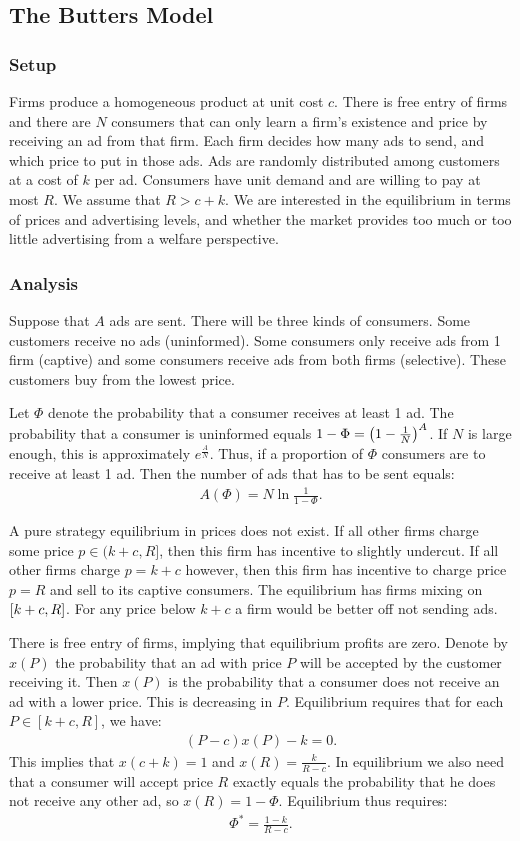 \subsection{The Butters Model}
\subsubsection{Setup}
Firms produce a homogeneous product at unit cost $c$. There is free entry of firms and there are $N$ consumers that can only learn a
firm's existence and price by receiving an ad from that firm. Each firm decides how many ads to send, and which price to put in those ads.
Ads are randomly distributed among customers at a cost of $k$ per ad. Consumers have unit demand and are willing to pay at most $R$.
We assume that $R>c+k$. We are interested in the equilibrium in terms of prices and advertising levels, and whether the market provides
too much or too little advertising from a welfare perspective.
\subsubsection{Analysis}
Suppose that $A$ ads are sent. There will be three kinds of consumers. Some customers receive no ads (uninformed). Some consumers only
receive ads from 1 firm (captive) and some consumers receive ads from both firms (selective). These customers buy from the lowest price.

Let $\Phi$ denote the probability that a consumer receives at least 1 ad. The probability that a consumer is uninformed equals
$1-\Phi=\left(1-\frac{1}{N}\right)^A$. If $N$ is large enough, this is approximately $e^{\frac{A}{N}}$. Thus, if a proportion of $\Phi$ consumers
are to receive at least 1 ad. Then the number of ads that has to be sent equals:
\begin{align}
	A(\Phi)=N\ln{\frac{1}{1-\Phi}}.
	\label{eq:ch3Cost}
\end{align}

A pure strategy equilibrium in prices does not exist. If all other firms charge some price $p\in(k+c,R]$, then this firm has incentive
to slightly undercut. If all other firms charge $p=k+c$ however, then this firm has incentive to charge price $p=R$ and sell to its captive
consumers. The equilibrium has firms mixing on $\left[k+c,R\right]$. For any price below $k+c$ a firm would be better off not sending ads.

There is free entry of firms, implying that equilibrium profits are zero. Denote by $x(P)$ the probability that an ad with price $P$ will
be accepted by the customer receiving it. Then $x(P)$ is the probability that a consumer does not receive an ad with a lower price. This
is decreasing in $P$. Equilibrium requires that for each $P\in[k+c,R]$, we have:
\begin{align}
	(P-c)x(P)-k=0.
\end{align}
This implies that $x(c+k)=1$ and $x(R)=\frac{k}{R-c}$. In equilibrium we also need that a consumer will accept price $R$ exactly equals the
probability that he does not receive any other ad, so $x(R)=1-\Phi$. Equilibrium thus requires:
\begin{align}
	\Phi^*=\frac{1-k}{R-c}.
\end{align}
